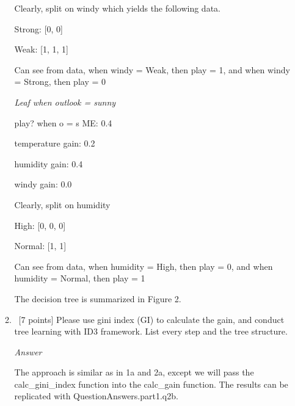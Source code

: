 \documentclass[12pt, fullpage,letterpaper]{article}
\begin{document}
\begin{enumerate}
\begin{enumerate}
    \vspace{5mm}
    
    Clearly, split on windy which yields the following data.
    
    \vspace{5mm}

    Strong: [0, 0]
    
    Weak: [1, 1, 1]
    
    \vspace{5mm}

    Can see from data, when windy = Weak, then play = 1, and when windy = Strong, then play = 0
    
    \vspace{5mm}
    \emph{Leaf when outlook = sunny}
    
    \vspace{5mm}
    
    play? when o = s ME:  0.4
    
    temperature gain: 0.2
    
    humidity gain: 0.4
    
    windy gain: 0.0
    
    \vspace{5mm}
    
    Clearly, split on humidity
    
    \vspace{5mm}
    
    High: [0, 0, 0]
    
    Normal: [1, 1]

    \vspace{5mm}

    Can see from data, when humidity = High, then play = 0, and when humidity = Normal, then play = 1
    
    \vspace{5mm}
    
    The decision tree is summarized in Figure 2.
	
	\item~[7 points] Please use gini index (GI) to calculate the gain, and conduct tree learning with ID3 framework. List every step and the tree structure.
	
	\emph{Answer}
	
	The approach is similar as in 1a and 2a, except we will pass the calc\_gini\_index function into the calc\_gain function. The results can be replicated with QuestionAnswers.part1.q2b.
	
	\vspace{5mm}
	

\end{enumerate}
\end{enumerate}
\end{document}
